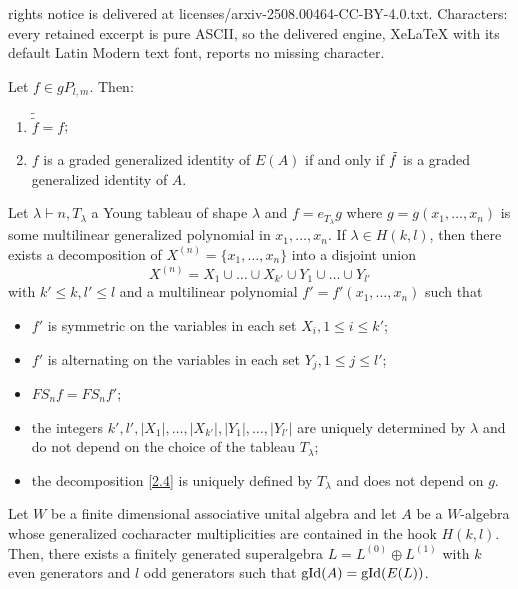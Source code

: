 \documentclass[10pt,a4paper]{amsart}
\DeclareMathOperator{\gid}{\textnormal{gId}}
\begin{document}
rights notice is delivered at licenses/arxiv-2508.00464-CC-BY-4.0.txt. Characters: every retained excerpt is pure ASCII, so the delivered engine, XeLaTeX with its default Latin Modern text font, reports no missing character.
\begin{lemma}\label{3.7.4}
Let $f\in gP_{l,m}$. Then: 
  \begin{enumerate}
    \item [1)] $\tilde{\tilde{f}}=f$;
    \item [2)] $f$ is a graded generalized identity of $E(A)$ if and only if $\Tilde{f}$ is a graded generalized identity of $A$.
  \end{enumerate}
\end{lemma}

\begin{lemma}
    \label{2.5.6}
    Let $\lambda \vdash n, T_\lambda$ a Young tableau of shape $\lambda$ and $f=e_{T_\lambda}g$ where $g=g(x_1,\ldots,x_n)$ is some multilinear generalized polynomial in $x_1,\ldots,x_n$. If $\lambda \in H(k,l)$, then there exists a decomposition of $X^{(n)}=\{ x_1,\ldots,x_n\}$ into a disjoint union
    \begin{equation}
        \label{2.4}
        X^{(n)}=X_1 \cup \ldots \cup X_{k'}\cup Y_1 \cup \ldots \cup Y_{l'}
    \end{equation}
    with $k' \le k, l' \le l$ and a multilinear polynomial $f'=f'(x_1,\ldots,x_n)$ such that 
    \begin{itemize} 
        \item $f'$ is symmetric on the variables in each set $X_i, 1 \le i \le k'$;
        \item $f'$ is alternating on the variables in each set $Y_j, 1 \le j \le l'$;
        \item $FS_nf=FS_nf'$;
        \item the integers $k',l', |X_1|,\ldots,|X_{k'}|,|Y_1|,\ldots,|Y_{l'}|$ are uniquely determined by $\lambda$ and do not depend on the choice of the tableau $T_\lambda$;
        \item the decomposition \eqref{2.4} is uniquely defined by $T_\lambda$ and does not depend on $g$.
    \end{itemize}
\end{lemma}

\begin{theorem}
\label{th: Grassmann envelope}
    Let $W$ be a finite dimensional associative unital algebra and let $A$ be a $W$-algebra whose generalized cocharacter multiplicities are contained in the hook $H(k,l)$. Then, there exists a finitely generated superalgebra $L=L^{(0)} \oplus L^{(1)}$ with $k$ even generators and $l$ odd generators such that $\gid(A)=\gid(E(L))$.
\end{theorem}
\end{document}
